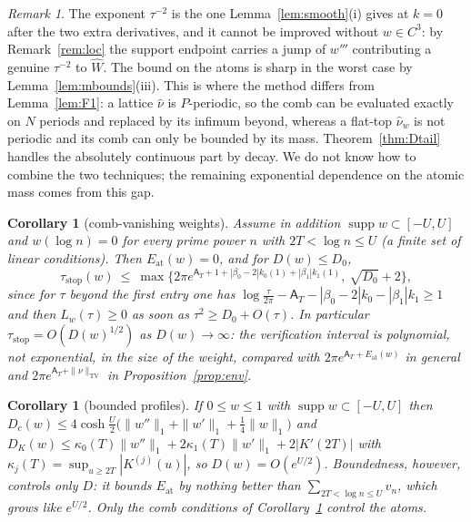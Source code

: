\documentclass[11pt]{amsart}
\newtheorem{corollary}[theorem]{Corollary}
\theoremstyle{definition}
\theoremstyle{remark}
\newtheorem{remark}[theorem]{Remark}
\newcommand{\supp}{\operatorname{supp}}
\newcommand{\TV}{\operatorname{TV}}
\newcommand{\nuh}{\widehat\nu}
\newcommand{\Aconst}{\mathsf A_T}
\begin{document}
\begin{remark}\label{rem:Dgrade}
The exponent $\tau^{-2}$ is the one Lemma~\ref{lem:smooth}(i) gives at $k=0$ after the two extra
derivatives, and it cannot be improved without $w\in C^3$: by Remark~\ref{rem:loc} the support
endpoint carries a jump of $w'''$ contributing a genuine $\tau^{-2}$ to $\widehat W$. The bound on
the atoms is sharp in the worst case by Lemma~\ref{lem:mbounds}(iii). This is where the method
differs from Lemma~\ref{lem:F1}: a lattice $\nuh$ is $P$-periodic, so the comb can be evaluated
exactly on $N$ periods and replaced by its infimum beyond, whereas a flat-top $\nuh_w$ is not
periodic and its comb can only be bounded by its mass. Theorem~\ref{thm:Dtail} handles the absolutely
continuous part by decay. We do not know how to combine the two techniques; the remaining
exponential dependence on the atomic mass comes from this gap.
\end{remark}

\begin{corollary}[comb-vanishing weights]\label{cor:comb}
Assume in addition $\supp w\subset[-U,U]$ and $w(\log n)=0$ for every prime power $n$ with
$2T<\log n\le U$ (a finite set of linear conditions). Then $E_{\mathrm{at}}(w)=0$, and for
$D(w)\le D_0$,
\[
\tau_{\mathrm{stop}}(w)\ \le\ \max\Big\{2\pi e^{\Aconst+1+|\beta_0-2|k_0(1)+|\beta_1|k_1(1)},\ \sqrt{D_0}+2\Big\},
\]
since for $\tau$ beyond the first entry one has $\log\frac\tau{2\pi}-\Aconst-|\beta_0-2|k_0-|\beta_1|k_1\ge1$
and then $L_w(\tau)\ge0$ as soon as $\tau^2\ge D_0+O(\tau)$. In particular
$\tau_{\mathrm{stop}}=O(D(w)^{1/2})$ as $D(w)\to\infty$: the verification interval is polynomial,
not exponential, in the size of the weight, compared with $2\pi e^{\Aconst+E_{\mathrm{at}}(w)}$ in
general and $2\pi e^{\Aconst+\|\nu\|_{\TV}}$ in Proposition~\ref{prop:env}.
\end{corollary}

\begin{corollary}[bounded profiles]\label{cor:bprof}
If $0\le w\le1$ with $\supp w\subset[-U,U]$ then
$D_c(w)\le4\cosh\frac U2\big(\|w''\|_1+\|w'\|_1+\frac14\|w\|_1\big)$ and
$D_K(w)\le\kappa_0(T)\|w''\|_1+2\kappa_1(T)\|w'\|_1+2|K'(2T)|$ with
$\kappa_j(T)=\sup_{u\ge2T}|K^{(j)}(u)|$, so $D(w)=O(e^{U/2})$. Boundedness, however, controls only
$D$: it bounds $E_{\mathrm{at}}$ by nothing better than $\sum_{2T<\log n\le U}v_n$, which grows like
$e^{U/2}$. Only the comb conditions of Corollary~\ref{cor:comb} control the atoms.
\end{corollary}
\end{document}
